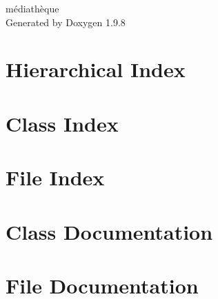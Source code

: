 \documentclass[twoside]{book}
\newcommand{\+}{\discretionary{\mbox{\scriptsize$\hookleftarrow$}}{}{}}
\newcommand{\clearemptydoublepage}{%
    \newpage{\pagestyle{empty}\cleardoublepage}%
  }
\begin{document}
  \raggedbottom
    \hypersetup{pageanchor=false,
                bookmarksnumbered=true,
                pdfencoding=unicode
               }
  \begin{titlepage}
  \vspace*{7cm}
  \begin{center}%
  {\Large médiathèque}\\
  \vspace*{1cm}
  {\large Generated by Doxygen 1.9.8}\\
  \end{center}
  \end{titlepage}
  \clearemptydoublepage
  \tableofcontents
  \clearemptydoublepage
  \hypersetup{pageanchor=true}
\chapter{Hierarchical Index}

\chapter{Class Index}

\chapter{File Index}

\chapter{Class Documentation}



\chapter{File Documentation}







  \backmatter
  \newpage
  \clearemptydoublepage
  \printindex
\end{document}

